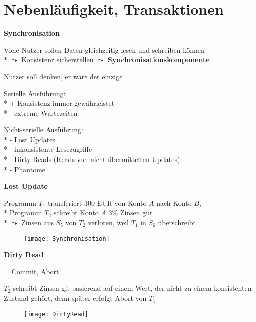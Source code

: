 \section{Nebenläufigkeit, Transaktionen}
\label{sec:parallel}

\textbf{Synchronisation}
\begin{items}
	\item Viele Nutzer sollen Daten gleichzeitig lesen und schreiben können
		\\*
		\( \leadsto \) Konsistenz sicherstellen \( \leadsto \) \textbf{Synchronisationskomponente}
	\item Nutzer soll denken, er wäre der einzige
	\item \underline{Serielle Ausführung}: 
		\\*
		+ Konsistenz immer gewährleistet 
		\\*
		- extreme Wartezeiten
	\item \underline{Nicht-serielle Ausführung}:
		\\*
		- Lost Updates
		\\*
		- inkonsistente Lesezugriffe
		\\*
		- Dirty Reads (Reads von nicht-übermittelten Updates)
		\\*
		- Phantome
\end{items}

\textbf{Lost Update}
\begin{items}
	\item Programm \( T_1 \) transferiert 300 EUR von Konto \( A \) nach Konto \( B \),
		\\*
		Programm \( T_2 \) schreibt Konto \( A \) \( 3 \% \) Zinsen gut
		\\*
		\( \leadsto \) Zinsen aus \( S_5 \) von \( T_2 \) verloren, weil \( T_1 \) in \( S_6 \) überschreibt
\end{items}
\begin{figure}[H]\centering\label{Synchronisation}\texttt{[image: Synchronisation]}\end{figure}

\textbf{Dirty Read}
\begin{items}
	\item = Commit, Abort
	\item \( T_2 \) schreibt Zinsen git basierend auf einem Wert, der nicht zu einem konsistenten Zustand gehört, denn später erfolgt Abort von \( T_1 \)
\end{items}
\begin{figure}[H]\centering\label{DirtyRead}\texttt{[image: DirtyRead]}\end{figure}

